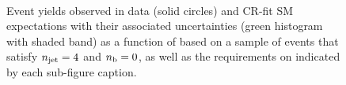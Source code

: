 \begin{figure}[h!]
\begin{center}
    \\
    \caption{Event yields observed in data (solid circles) and CR-fit SM expectations with their associated uncertainties (green histogram with shaded band) as a function of \HTmiss based on a sample of events that satisfy $n_{\text{jet}} = 4$ and $n_{\text{b}} = 0$, as well as the requirements on \scalht indicated by each sub-figure caption. }
    \label{fig:mhtdim_eq4j_eq0b}
  \end{center}
\end{figure}

